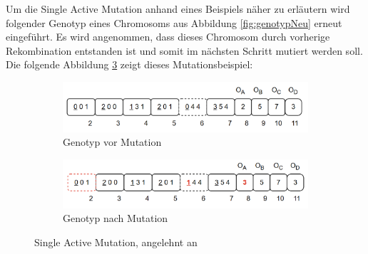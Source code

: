 Um die Single Active Mutation anhand eines Beispiels näher zu erläutern wird folgender Genotyp eines Chromosoms aus Abbildung \ref{fig:genotypNeu} erneut eingeführt.
Es wird angenommen, dass dieses Chromosom durch vorherige Rekombination entstanden ist und somit im nächsten Schritt mutiert werden soll.
Die folgende Abbildung \ref{fig:mutationGesamt} zeigt dieses Mutationsbeispiel:

\begin{figure}[H]
	\centering
	\begin{subfigure}[b]{\textwidth}
		\centering
		\includegraphics[scale = 0.55]{Bilder/TorabiBeispielGenotypNeu.png}
		\caption{Genotyp vor Mutation}
		\label{fig:genotypVorMutation}
	\end{subfigure}
	
	\hfill
	
	\begin{subfigure}[b]{\textwidth}
		\centering
		\includegraphics[scale = 0.568]{Bilder/GenotypNachMutation.png}
		\caption{Genotyp nach Mutation}
		\label{fig:genotypNachMutation}
	\end{subfigure}
	\caption{Single Active Mutation, angelehnt an \cite{torabi_using_2022}}
	\label{fig:mutationGesamt}
\end{figure}

